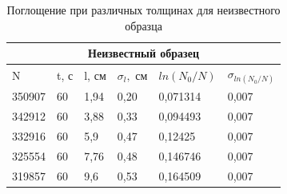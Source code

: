 \documentclass[a4paper,12pt]{article} %
\begin{document}
\begin{table}[h!]
\begin{center}

\begin{tabular}{|llllll|}
\hline
\multicolumn{6}{|c|}{Неизвестный образец}                                                                                                                                                          \\ \hline
\multicolumn{1}{|l|}{N}      & \multicolumn{1}{l|}{t, с} & \multicolumn{1}{l|}{l, см} & \multicolumn{1}{l|}{$\sigma_l,$ см} & \multicolumn{1}{l|}{$ln(N_0/N)$} & $\sigma_{ln(N_0/N)}$ \\ \hline
\multicolumn{1}{|l|}{350907} & \multicolumn{1}{l|}{60}   & \multicolumn{1}{l|}{1,94}  & \multicolumn{1}{l|}{0,20}           & \multicolumn{1}{l|}{0,071314}    & 0,007                \\ \hline
\multicolumn{1}{|l|}{342912} & \multicolumn{1}{l|}{60}   & \multicolumn{1}{l|}{3,88}  & \multicolumn{1}{l|}{0,33}           & \multicolumn{1}{l|}{0,094493}    & 0,007                \\ \hline
\multicolumn{1}{|l|}{332916} & \multicolumn{1}{l|}{60}   & \multicolumn{1}{l|}{5,9}   & \multicolumn{1}{l|}{0,47}           & \multicolumn{1}{l|}{0,12425}     & 0,007                \\ \hline
\multicolumn{1}{|l|}{325554} & \multicolumn{1}{l|}{60}   & \multicolumn{1}{l|}{7,76}  & \multicolumn{1}{l|}{0,48}           & \multicolumn{1}{l|}{0,146746}    & 0,007                \\ \hline
\multicolumn{1}{|l|}{319857} & \multicolumn{1}{l|}{60}   & \multicolumn{1}{l|}{9,6}   & \multicolumn{1}{l|}{0,53}           & \multicolumn{1}{l|}{0,164509}    & 0,007                \\ \hline
\end{tabular}


\end{center}

\caption{Поглощение при различных толщинах для неизвестного образца}
\end{table}
\end{document}
